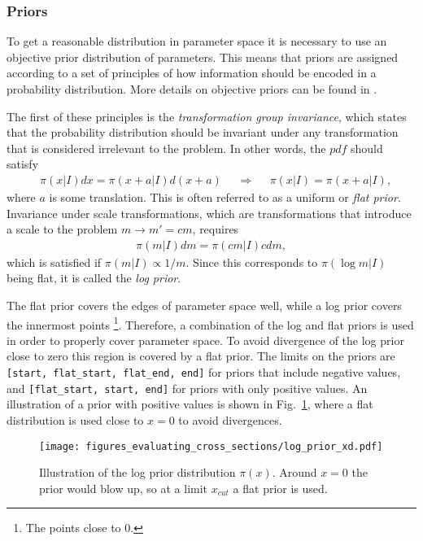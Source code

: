 \documentclass[twoside,english]{uiofysmaster}
\begin{document}
\subsubsection{Priors}

To get a reasonable distribution in parameter space it is necessary to use an objective prior distribution of parameters. This means that priors are assigned according to a set of principles of how information should be encoded in a probability distribution. More details on objective priors can be found in \cite{kvellestad2015chasing}.

The first of these principles is the \textit{transformation group invariance}, which states that the probability distribution should be invariant under any transformation that is considered irrelevant to the problem. In other words, the $pdf$ should satisfy
\begin{align}
&\pi (x|I) dx = \pi (x+a|I)d(x+a) &&\Rightarrow &&\pi (x|I) = \pi (x+a|I) ,
\end{align}
where $a$ is some translation. This is often referred to as a uniform or \textit{flat prior}. Invariance under scale transformations, which are transformations that introduce a scale to the problem $m \rightarrow m' = cm$, requires
\begin{align}
\pi (m | I) dm = \pi (cm|I) c dm,
\end{align}
which is satisfied if $\pi (m |I) \propto 1/m$. Since this corresponds to $\pi (\log m | I)$ being flat, it is called the \textit{log prior}. 

The flat prior covers the edges of parameter space well, while a log prior covers the innermost points \footnote{The points close to 0.}. Therefore, a combination of the log and flat priors is used in order to properly cover parameter space. To avoid divergence of the log prior close to zero this region is covered by a flat prior. The limits on the priors are \verb|[start, flat_start, flat_end, end]| for priors that include negative values, and \verb|[flat_start, start, end]| for priors with only positive values. An illustration of a prior with positive values is shown in Fig.~\ref{Fig:: evaluating cross : prior illustration}, where a flat distribution is used close to $x=0$ to avoid divergences.

\begin{figure}
\centering
\texttt{[image: figures\_evaluating\_cross\_sections/log\_prior\_xd.pdf]}
\caption{Illustration of the log prior distribution $\pi(x)$. Around $x=0$ the prior would blow up, so at a limit $x_{cut}$ a flat prior is used.}
\label{Fig:: evaluating cross : prior illustration}
\end{figure}
\end{document}
